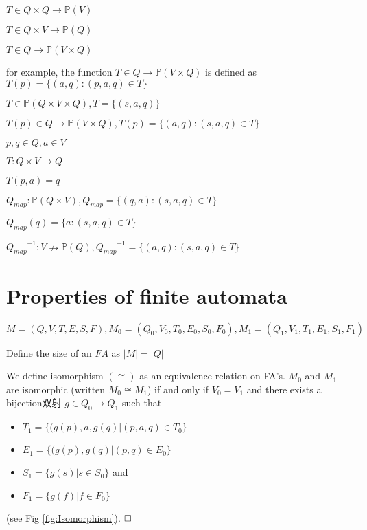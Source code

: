 $T \in Q\times Q \to \mathbb{P}(V)$

$T \in Q \times V \to \mathbb{P}(Q)$

$T \in Q \to \mathbb{P}(V \times Q)$

for example, the function $T \in Q \to \mathbb{P}(V \times Q)$ is defined as $T(p) = \{(a,q):(p,a,q) \in T\}$


\hfill

$T \in \mathbb{P}(Q \times V \times Q), T = \{(s,a,q) \}$

$T(p)\in Q \to \mathbb{P}(V\times Q), T(p) = \{(a,q):(s,a,q) \in T\}$

\hfill

$p,q\in Q, a\in V$

$T:Q\times V\to Q$

$T(p,a)={q}$

\hfill

$Q_{map}:\mathbb{P}(Q\times V), Q_{map} = \{(q,a): (s,a,q) \in T\}$

$Q_{map}(q) = \{a: (s,a,q)\in T\}$

${Q_{map}}^{-1}: V \nrightarrow \mathbb{P}(Q), {Q_{map}}^{-1} = \{(a,q): (s,a,q) \in T\}$

\section{Properties of finite automata}

$M=(Q,V,T,E,S,F),M_0=(Q_0,V_0,T_0,E_0,S_0,F_0),M_1=(Q_1,V_1,T_1,E_1,S_1,F_1)$

\begin{definition}[Size of an $FA$] 
	Define the size of an $FA$ as $|M|=|Q|$
\end{definition}

\begin{definition}
	We define isomorphism $(\cong)$ as an equivalence relation on FA's. $M_0$ and $M_1$ are isomorphic (written $M_0\cong M_1$) if and only if $V_0=V_1$ and there exists a bijection双射 $g\in Q_0\to Q_1$ such that
	\begin{itemize}
		\item $T_1=\{(g(p),a,g(q)|(p,a,q)\in T_0\}$
		\item $E_1=\{(g(p),g(q)|(p,q)\in E_0\}$
		\item $S_1=\{g(s)|s\in S_0\}$ and
		\item $F_1=\{g(f)|f\in F_0\}$
	\end{itemize} (see Fig \ref{fig:Isomorphism}). $\hfill\square$
\end{definition}

